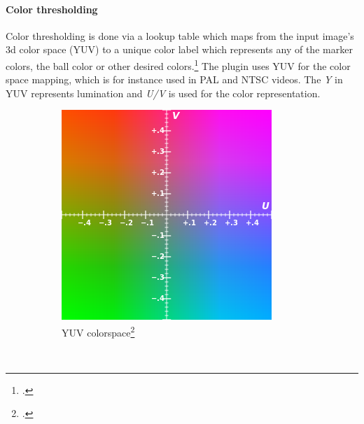 \paragraph{Color thresholding}
Color thresholding is done via a lookup table which maps from the input image's
3d color space (YUV) to a unique color label which represents any of the marker
colors, the ball color or other desired colors.\footcite[Cf.][p. 4 et sq.]{zickler_ssl_vision}
The plugin uses YUV for the color space mapping, which is for instance used
in PAL and NTSC videos. The \textit{Y} in YUV represents lumination and
\textit{U/V} is used for the color representation.

\begin{savenotes}
\begin{figure}
        \centering
        \begin{subfigure}[b]{0.3\textwidth}
                \centering
                \includegraphics[width=\textwidth]{img/YUV.png}
                \caption[YUV colorspace]{YUV colorspace\footcite[][]{yuv_img}}
                \label{fig:yuv_normal}
        \end{subfigure}%
        ~ %
        \begin{subfigure}[b]{0.3\textwidth}

\end{subfigure}
\end{figure}
\end{savenotes}
